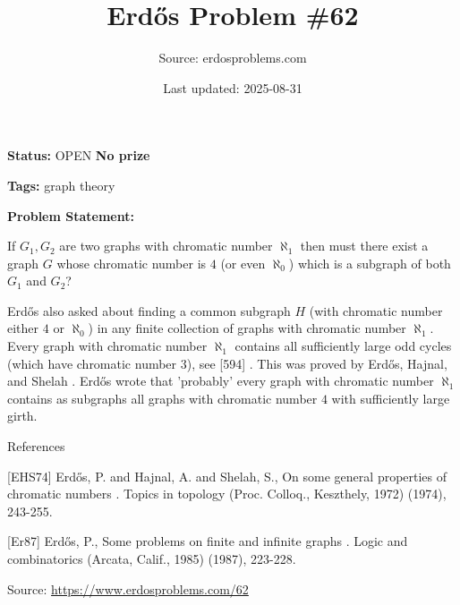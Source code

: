 \documentclass{article}
\title{Erd\H{o}s Problem \#62}
\date{Last updated: 2025-08-31}
\author{Source: erdosproblems.com}
\begin{document}
\maketitle

\noindent\textbf{Status:} OPEN \quad \textbf{No prize}

\noindent\textbf{Tags:} graph theory

\medskip

\noindent\textbf{Problem Statement:}

If $G_1,G_2$ are two graphs with chromatic number $\aleph_1$ then must there exist a graph $G$ whose chromatic number is $4$ (or even $\aleph_0$) which is a subgraph of both $G_1$ and $G_2$?




Erd\H{o}s also asked \cite{Er87} about finding a common subgraph $H$ (with chromatic number either $4$ or $\aleph_0$) in any finite collection of graphs with chromatic number $\aleph_1$. Every graph with chromatic number $\aleph_1$ contains all sufficiently large odd cycles (which have chromatic number $3$), see [594] . This was proved by Erd\H{o}s, Hajnal, and Shelah \cite{EHS74}. Erd\H{o}s wrote \cite{Er87} that 'probably' every graph with chromatic number $\aleph_1$ contains as subgraphs all graphs with chromatic number $4$ with sufficiently large girth.




References

[EHS74] Erd\H{o}s, P. and Hajnal, A. and Shelah, S., On some general properties of chromatic numbers . Topics in topology (Proc. Colloq., Keszthely, 1972) (1974), 243-255.

[Er87] Erd\H{o}s, P., Some problems on finite and infinite graphs . Logic and combinatorics (Arcata, Calif., 1985) (1987), 223-228.


\bigskip
\noindent\small{Source: \url{https://www.erdosproblems.com/62}}
\end{document}
